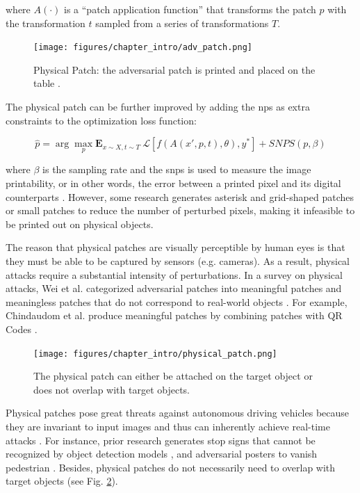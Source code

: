 where $A(\cdot)$ is a “patch application function” that transforms the patch
$p$ with the transformation $t$ sampled from a series of transformations $T$.

\begin{figure}[H]
\centering
\texttt{[image: figures/chapter\_intro/adv\_patch.png]}
\caption{Physical Patch: the adversarial patch is printed and placed on the table \citep{brown2017adversarial}.}
\label{fig.physical_patch}
\end{figure}

The physical patch can be further improved by adding the \acrfull{nps} as extra constraints to the optimization loss function:

\begin{equation}
\hat{p} = \arg \underset{p}{\max}\mathbf{E}_{x \sim X, t \sim T}\ \mathcal{L}[f(A(x', p, t), \theta), y^*] + SNPS(p, \beta)
\end{equation}

where $\beta$ is the sampling rate and the \acrfull{snps} is used to measure the image printability, or in other words, the error between a printed pixel and its digital counterparts \citep{wang2021daedalus}. However, some research generates asterisk and grid-shaped patches \citep{wu2020dpattack} or small patches \citep{huang2021rpattack} to reduce the number of perturbed pixels, making it infeasible to be printed out on physical objects.

The reason that physical patches are visually perceptible by human eyes is that they must be able to be captured by sensors (e.g. cameras). As a result, physical attacks require a substantial intensity of perturbations. In a survey on physical attacks, Wei et al. categorized adversarial patches into meaningful patches and meaningless patches that do not correspond to real-world objects \citep{wei2023visually}. For example, Chindaudom et al. produce meaningful patches by combining patches with QR Codes \citep{chindaudom2020adversarialqr, chindaudom2022surreptitious}. 

\begin{figure}[H]
\centering
\texttt{[image: figures/chapter\_intro/physical\_patch.png]}
\caption{The physical patch can either be attached on the target object or does not overlap with target objects.}
\label{fig.physical_patch_overlap}
\end{figure}

Physical patches pose great threats against autonomous driving vehicles because they are invariant to input images and thus can inherently achieve real-time attacks \citep{threet2021physical}. For instance, prior research generates stop signs that cannot be recognized by object detection models \citep{song2018physical} \citep{chen2019shapeshifter}, and adversarial posters to vanish pedestrian \citep{thys2019fooling, wang2021towards}. Besides, physical patches do not necessarily need to overlap with target objects (see Fig. \ref{fig.physical_patch_overlap}).

